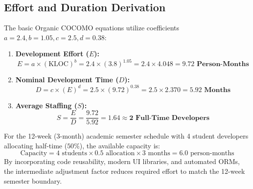 \documentclass[12pt,a4paper,oneside]{report}
\begin{document}
\subsection{Effort and Duration Derivation}
The basic Organic COCOMO equations utilize coefficients $a = 2.4, b = 1.05, c = 2.5, d = 0.38$:
\begin{enumerate}
    \item \textbf{Development Effort ($E$):}
    \begin{equation}
        E = a \times (\text{KLOC})^b = 2.4 \times (3.8)^{1.05} = 2.4 \times 4.048 = \mathbf{9.72\text{ Person-Months}}
    \end{equation}
    \item \textbf{Nominal Development Time ($D$):}
    \begin{equation}
        D = c \times (E)^d = 2.5 \times (9.72)^{0.38} = 2.5 \times 2.370 = \mathbf{5.92\text{ Months}}
    \end{equation}
    \item \textbf{Average Staffing ($S$):}
    \begin{equation}
        S = \frac{E}{D} = \frac{9.72}{5.92} = \mathbf{1.64 \approx 2\text{ Full-Time Developers}}
    \end{equation}
\end{enumerate}
For the 12-week (3-month) academic semester schedule with 4 student developers allocating half-time ($50\%$), the available capacity is:
\begin{equation}
    \text{Capacity} = 4 \text{ students} \times 0.5 \text{ allocation} \times 3 \text{ months} = 6.0 \text{ person-months}
\end{equation}
By incorporating code reusability, modern UI libraries, and automated ORMs, the intermediate adjustment factor reduces required effort to match the 12-week semester boundary.
\end{document}
